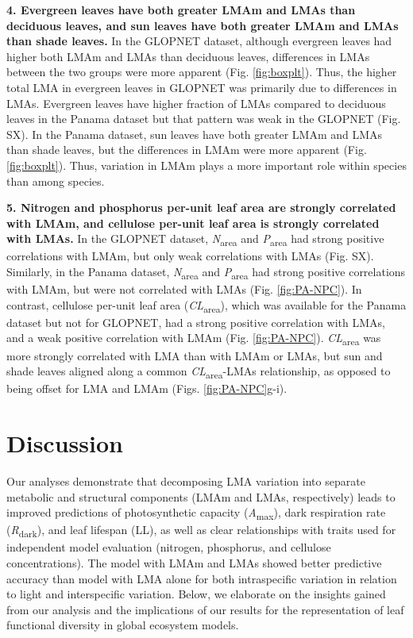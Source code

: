 \documentclass[
  12pt,
]{article}
\providecommand{\DIFaddtex}[1]{{\protect\color{blue}\uwave{#1}}} %
\providecommand{\DIFaddbegin}{} %
\providecommand{\DIFaddend}{} %
\providecommand{\DIFadd}[1]{\texorpdfstring{\DIFaddtex{#1}}{#1}} %
\newcommand{\DIFaddincludegraphics}[2][]{{\color{blue}\fbox{\DIFOincludegraphics[#1]{#2}}}} %
\DeclareRobustCommand{\DIFaddbegin}{\DIFOaddbegin \let\includegraphics\DIFaddincludegraphics} %
\DeclareRobustCommand{\DIFaddend}{\DIFOaddend \let\includegraphics\DIFOincludegraphics} %
\begin{document}
\textbf{4. Evergreen leaves have both greater LMAm and LMAs than deciduous leaves, and sun leaves have both greater LMAm and LMAs than shade leaves.}
In the GLOPNET dataset, although evergreen leaves had higher both LMAm and LMAs than deciduous leaves, differences in LMAs between the two groups were more apparent (Fig. \DIFaddbegin \DIFadd{Fig.~}\DIFaddend \ref{fig:boxplt}).
Thus, the higher total LMA in evergreen leaves in GLOPNET was primarily due to differences in LMAs.
Evergreen leaves have higher fraction of LMAs compared to deciduous leaves in the Panama dataset but that pattern was weak in the GLOPNET (Fig. SX).
In the Panama dataset, sun leaves have both greater LMAm and LMAs than shade leaves, but the differences in LMAm were more apparent (Fig. \DIFaddbegin \DIFadd{Fig.~}\DIFaddend \ref{fig:boxplt}).
Thus, variation in LMAm plays a more important role within species than among species.

\textbf{5. Nitrogen and phosphorus per-unit leaf area are strongly correlated with LMAm, and cellulose per-unit leaf area is strongly correlated with LMAs.}
In the GLOPNET dataset, \emph{N}\textsubscript{area} and \emph{P}\textsubscript{area} had strong positive correlations with LMAm, but only weak correlations with LMAs (Fig. SX).
Similarly, in the Panama dataset, \emph{N}\textsubscript{area} and \emph{P}\textsubscript{area} had strong positive correlations with LMAm, but were not correlated with LMAs (Fig. \DIFaddbegin \DIFadd{Fig.~}\DIFaddend \ref{fig:PA-NPC}).
In contrast, cellulose per-unit leaf area (\emph{CL}\textsubscript{area}), which was available for the Panama dataset but not for GLOPNET, had a strong positive correlation with LMAs, and a weak positive correlation with LMAm (Fig. \DIFaddbegin \DIFadd{Fig.~}\DIFaddend \ref{fig:PA-NPC}).
\emph{CL}\textsubscript{area} was more strongly correlated with LMA than with LMAm or LMAs, but sun and shade leaves aligned along a common \emph{CL}\textsubscript{area}-LMAs relationship, as opposed to being offset for LMA and LMAm (Figs. \DIFaddbegin \DIFadd{Fig.~}\DIFaddend \ref{fig:PA-NPC}g-i).

\hypertarget{discussion}{%
\section{Discussion}\label{discussion}}

Our analyses demonstrate that decomposing LMA variation into separate metabolic and structural components (LMAm and LMAs, respectively) leads to improved predictions of photosynthetic capacity (\emph{A}\textsubscript{max}), dark respiration rate (\emph{R}\textsubscript{dark}), and leaf lifespan (LL), as well as clear relationships with traits used for independent model evaluation (nitrogen, phosphorus, and cellulose concentrations).
The model with LMAm and LMAs showed better predictive accuracy than model with LMA alone for both intraspecific variation in relation to light and interspecific variation.
Below, we elaborate on the insights gained from our analysis and the implications of our results for the representation of leaf functional diversity in global ecosystem models.
\end{document}
